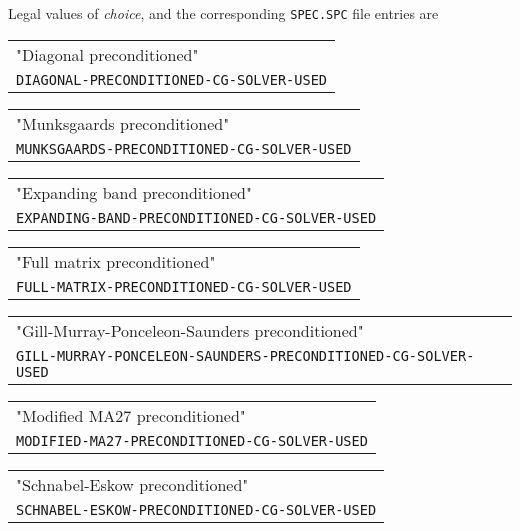 Legal values of {\it choice}, and the corresponding
{\tt SPEC.SPC} file entries are
\begin{center}
 \begin{tabular}{l}
  "Diagonal preconditioned"\\
  \parbox[t]{5.in}{\hfill\tt DIAGONAL-PRECONDITIONED-CG-SOLVER-USED}\\
 \end{tabular}
\end{center}
\begin{center}
 \begin{tabular}{l}
  "Munksgaards preconditioned"\\
  \parbox[t]{5.in}{\hfill\tt MUNKSGAARDS-PRECONDITIONED-CG-SOLVER-USED}\\
 \end{tabular}
\end{center}
\begin{center}
 \begin{tabular}{l}
  "Expanding band preconditioned"\\
  \parbox[t]{5.in}{\hfill\tt EXPANDING-BAND-PRECONDITIONED-CG-SOLVER-USED}\\
 \end{tabular}
\end{center}
\begin{center}
 \begin{tabular}{l}
  "Full matrix preconditioned"\\
  \parbox[t]{5.in}{\hfill\tt FULL-MATRIX-PRECONDITIONED-CG-SOLVER-USED}\\
 \end{tabular}
\end{center}
\begin{center}
 \begin{tabular}{l}
  "Gill-Murray-Ponceleon-Saunders preconditioned"\\
  \parbox[t]{5.in}{\hfill\tt GILL-MURRAY-PONCELEON-SAUNDERS-PRECONDITIONED-CG-SOLVER-USED}\\
 \end{tabular}
\end{center}
\begin{center}
 \begin{tabular}{l}
  "Modified MA27 preconditioned"\\
  \parbox[t]{5.in}{\hfill\tt MODIFIED-MA27-PRECONDITIONED-CG-SOLVER-USED}\\
 \end{tabular}
\end{center}
\begin{center}
 \begin{tabular}{l}
  "Schnabel-Eskow preconditioned"\\
  \parbox[t]{5.in}{\hfill\tt SCHNABEL-ESKOW-PRECONDITIONED-CG-SOLVER-USED}\\
 \end{tabular}
\end{center}

